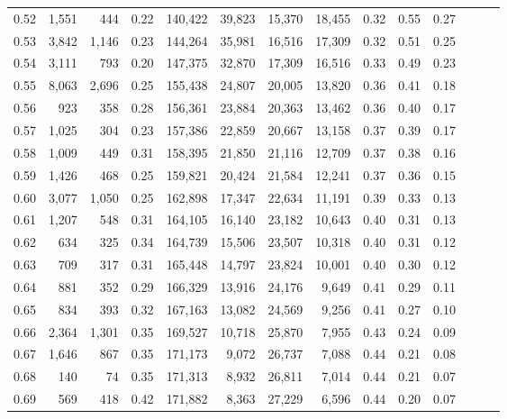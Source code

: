 \begin{tabular}{rrrrrrrrrrrrrr}
0.52 &   1,551 &    444 &  0.22 &  140,422 &   39,823 &  15,370 &  18,455 &  0.32 &  0.55 &      0.27 \\
0.53 &   3,842 &  1,146 &  0.23 &  144,264 &   35,981 &  16,516 &  17,309 &  0.32 &  0.51 &      0.25 \\
0.54 &   3,111 &    793 &  0.20 &  147,375 &   32,870 &  17,309 &  16,516 &  0.33 &  0.49 &      0.23 \\
0.55 &   8,063 &  2,696 &  0.25 &  155,438 &   24,807 &  20,005 &  13,820 &  0.36 &  0.41 &      0.18 \\
0.56 &     923 &    358 &  0.28 &  156,361 &   23,884 &  20,363 &  13,462 &  0.36 &  0.40 &      0.17 \\
0.57 &   1,025 &    304 &  0.23 &  157,386 &   22,859 &  20,667 &  13,158 &  0.37 &  0.39 &      0.17 \\
0.58 &   1,009 &    449 &  0.31 &  158,395 &   21,850 &  21,116 &  12,709 &  0.37 &  0.38 &      0.16 \\
0.59 &   1,426 &    468 &  0.25 &  159,821 &   20,424 &  21,584 &  12,241 &  0.37 &  0.36 &      0.15 \\
0.60 &   3,077 &  1,050 &  0.25 &  162,898 &   17,347 &  22,634 &  11,191 &  0.39 &  0.33 &      0.13 \\
0.61 &   1,207 &    548 &  0.31 &  164,105 &   16,140 &  23,182 &  10,643 &  0.40 &  0.31 &      0.13 \\
0.62 &     634 &    325 &  0.34 &  164,739 &   15,506 &  23,507 &  10,318 &  0.40 &  0.31 &      0.12 \\
0.63 &     709 &    317 &  0.31 &  165,448 &   14,797 &  23,824 &  10,001 &  0.40 &  0.30 &      0.12 \\
0.64 &     881 &    352 &  0.29 &  166,329 &   13,916 &  24,176 &   9,649 &  0.41 &  0.29 &      0.11 \\
0.65 &     834 &    393 &  0.32 &  167,163 &   13,082 &  24,569 &   9,256 &  0.41 &  0.27 &      0.10 \\
0.66 &   2,364 &  1,301 &  0.35 &  169,527 &   10,718 &  25,870 &   7,955 &  0.43 &  0.24 &      0.09 \\
0.67 &   1,646 &    867 &  0.35 &  171,173 &    9,072 &  26,737 &   7,088 &  0.44 &  0.21 &      0.08 \\
0.68 &     140 &     74 &  0.35 &  171,313 &    8,932 &  26,811 &   7,014 &  0.44 &  0.21 &      0.07 \\
0.69 &     569 &    418 &  0.42 &  171,882 &    8,363 &  27,229 &   6,596 &  0.44 &  0.20 &      0.07 \\

\end{tabular}
